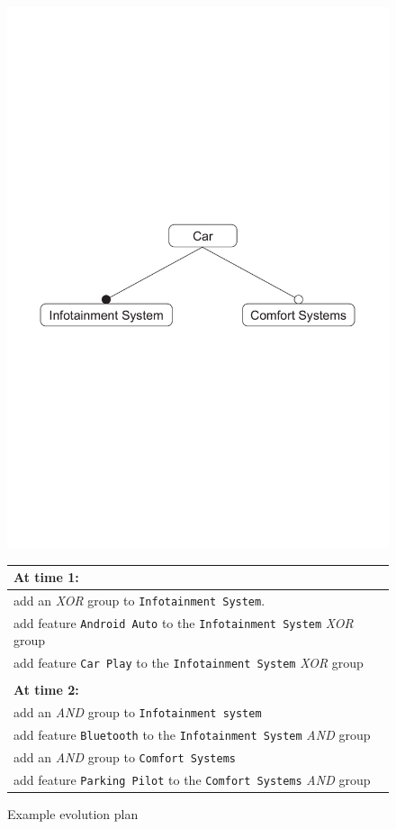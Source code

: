 \documentclass[a4paper,english]{ifimaster}
\begin{document}
\begin{figure}
  \centering
  \includegraphics[width=\textwidth]{illustrations/initial.pdf}
  \begin{tabular}{l}
    \textbf{At time 1:}                                           \\ \hline
    add an \textit{XOR} group to \texttt{Infotainment System}.                      \\
    add feature \texttt{Android Auto} to the \texttt{Infotainment System} \textit{XOR} group \\
    add feature \texttt{Car Play} to the \texttt{Infotainment System} \textit{XOR} group     \\
                                                                  \\
    \textbf{At time 2:}                                           \\ \hline
    add an \textit{AND} group to \texttt{Infotainment system} \\
    add feature \texttt{Bluetooth} to the \texttt{Infotainment System} \textit{AND} group \\
    add an \textit{AND} group to \texttt{Comfort Systems}                           \\
    add feature \texttt{Parking Pilot} to the \texttt{Comfort Systems} \textit{AND} group
  \end{tabular}
  \caption{Example evolution plan}
  \label{fig:feature-plan}
\end{figure}
\end{document}
